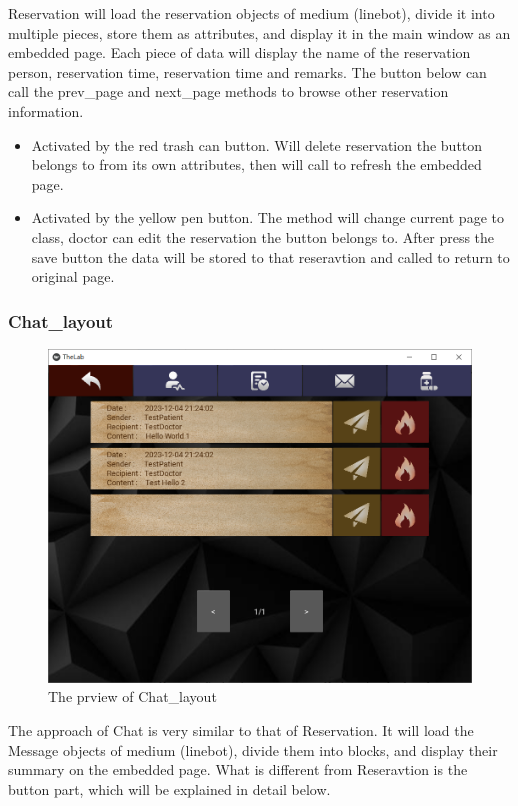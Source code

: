 \documentclass{article}
\begin{document}
Reservation will load the reservation objects of medium (linebot), divide it into multiple pieces, store them as attributes, and display it in the main window as an embedded page. Each piece of data will display the name of the reservation person, reservation time, reservation time and remarks. The button below can call the prev\_page and next\_page methods to browse other reservation information.

\begin{itemize}
  \item {} Activated by the red trash can button. Will delete reservation the button belongs to from its own attributes, then will call  to refresh the embedded page.
  \item {} Activated by the yellow pen button. The method will change current page to  class, doctor can edit the reservation the button belongs to. After press the save button the data will be stored to that reseravtion and called  to return to original page.
\end{itemize}

\subsubsection*{Chat\_layout}
\begin{figure}[h]
  \centering
  \includegraphics[scale = 0.5]{asset/doctor_gui/frontend_chat_browse.png}
  \caption{The prview of Chat\_layout}
  \label{fig:frontend_chat_browse}
\end{figure}
The approach of Chat is very similar to that of Reservation. It will load the Message objects of medium (linebot), divide them into blocks, and display their summary on the embedded page. What is different from Reseravtion is the button part, which will be explained in detail below.
\end{document}

